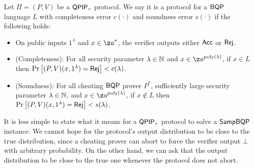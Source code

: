 \begin{definition}
    Let $\Pi=(P, V)$ be a $\operatorname{\mathsf{QPIP}}_\tau$ protocol.
    We say it is a protocol for a $\operatorname{\mathsf{BQP}}$ language $L$ with completeness error $c(\cdot)$ and soundness error $s(\cdot)$ if the following holds:
\begin{itemize}
        \item On public inputs $1^\lambda$ and $x\in\zo^*$, the verifier outputs either $\mathsf{Acc}$ or $\mathsf{Rej}$.
        \item (Completeness): For all security parameter $\lambda\in\mathbb{N}$ and $x\in\zo^{\poly(\lambda)}$, if $x\in L$ then
        $\Pr\left[(P, V)(x, 1^\lambda)=\mathsf{Rej}\right]<c(\lambda)$.
        \item (Soundness): For all cheating $\operatorname{\mathsf{BQP}}$ prover $P^*$, sufficiently large security parameter $\lambda\in\mathbb{N}$, and $x\in\zo^{\poly(\lambda)}$, if $x \notin L$ then $\Pr\left[(P, V)(x, 1^\lambda)=\mathsf{Rej}\right]<s(\lambda)$.
    \end{itemize}
\end{definition}

It is less simple to state what it means for a $\operatorname{\mathsf{QPIP}}_\tau$ protocol to solve a $\operatorname{\mathsf{SampBQP}}$ instance.
We cannot hope for the protocol's output distribution to be close to the true distribution,
since a cheating prover can abort to force the verifier output $\bot$ with arbitrary probability.
On the other hand, we can ask that the output distribution to be close to the true one whenever the protocol does not abort.

